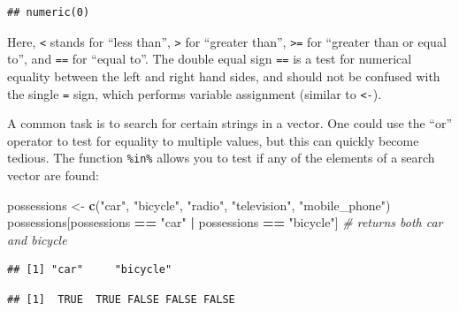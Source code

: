 \documentclass[]{book}
\newenvironment{Shaded}{\begin{snugshade}}{\end{snugshade}}
\newcommand{\KeywordTok}[1]{\textcolor[rgb]{0.13,0.29,0.53}{\textbf{#1}}}
\newcommand{\StringTok}[1]{\textcolor[rgb]{0.31,0.60,0.02}{#1}}
\newcommand{\CommentTok}[1]{\textcolor[rgb]{0.56,0.35,0.01}{\textit{#1}}}
\newcommand{\OperatorTok}[1]{\textcolor[rgb]{0.81,0.36,0.00}{\textbf{#1}}}
\newcommand{\NormalTok}[1]{#1}
\begin{document}
\begin{verbatim}
## numeric(0)
\end{verbatim}

Here, \texttt{\textless{}} stands for ``less than'',
\texttt{\textgreater{}} for ``greater than'', \texttt{\textgreater{}=}
for ``greater than or equal to'', and \texttt{==} for ``equal to''. The
double equal sign \texttt{==} is a test for numerical equality between
the left and right hand sides, and should not be confused with the
single \texttt{=} sign, which performs variable assignment (similar to
\texttt{\textless{}-}).

A common task is to search for certain strings in a vector. One could
use the ``or'' operator \texttt{\textbar{}} to test for equality to
multiple values, but this can quickly become tedious. The function
\texttt{\%in\%} allows you to test if any of the elements of a search
vector are found:

\begin{Shaded}
\begin{Highlighting}[]
\NormalTok{possessions <-}\StringTok{ }\KeywordTok{c}\NormalTok{(}\StringTok{"car"}\NormalTok{, }\StringTok{"bicycle"}\NormalTok{, }\StringTok{"radio"}\NormalTok{, }\StringTok{"television"}\NormalTok{, }\StringTok{"mobile_phone"}\NormalTok{)}
\NormalTok{possessions[possessions }\OperatorTok{==}\StringTok{ "car"} \OperatorTok{|}\StringTok{ }\NormalTok{possessions }\OperatorTok{==}\StringTok{ "bicycle"}\NormalTok{] }\CommentTok{# returns both car and bicycle}
\end{Highlighting}
\end{Shaded}

\begin{verbatim}
## [1] "car"     "bicycle"
\end{verbatim}

\begin{Shaded}
\end{Shaded}

\begin{verbatim}
## [1]  TRUE  TRUE FALSE FALSE FALSE
\end{verbatim}

\begin{Shaded}
\end{Shaded}
\end{document}
